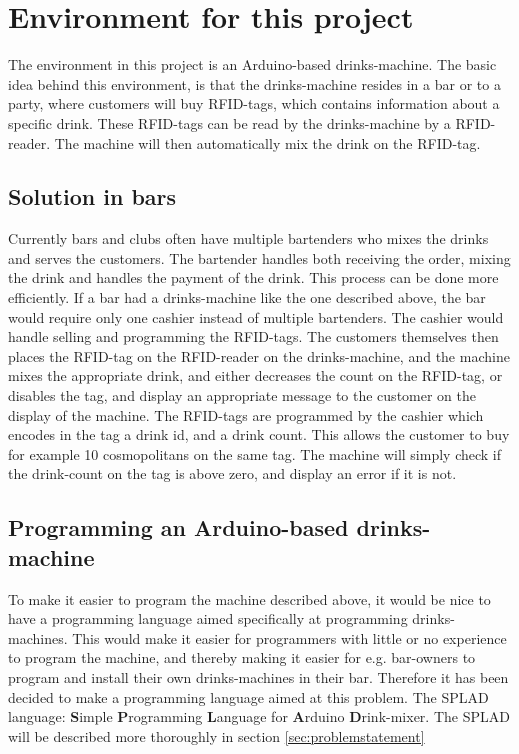 \section{Environment for this project}
The environment in this project is an Arduino-based drinks-machine. The basic idea behind this environment, is that the drinks-machine resides in a bar or to a party, where customers will buy RFID-tags, which contains information about a specific drink. These RFID-tags can be read by the drinks-machine by a RFID-reader. The machine will then automatically mix the drink on the RFID-tag.

\subsection{Solution in bars}
Currently bars and clubs often have multiple bartenders who mixes the drinks and serves the customers. The bartender handles both receiving the order, mixing the drink and handles the payment of the drink. This process can be done more efficiently. If a bar had a drinks-machine like the one described above, the bar would require only one cashier instead of multiple bartenders. The cashier would handle selling and programming the RFID-tags. The customers themselves then places the RFID-tag on the RFID-reader on the drinks-machine, and the machine mixes the appropriate drink, and either decreases the count on the RFID-tag, or disables the tag, and display an appropriate message to the customer on the display of the machine. The RFID-tags are programmed by the cashier which encodes in the tag a drink id, and a drink count. This allows the customer to buy for example 10 cosmopolitans on the same tag. The machine will simply check if the drink-count on the tag is above zero, and display an error if it is not.

\subsection{Programming an Arduino-based drinks-machine}
To make it easier to program the machine described above, it would be nice to have a programming language aimed specifically at programming drinks-machines. This would make it easier for programmers with little or no experience to program the machine, and thereby making it easier for e.g. bar-owners to program and install their own drinks-machines in their bar. Therefore it has been decided to make a programming language aimed at this problem. The SPLAD language: \textbf{S}imple \textbf{P}rogramming \textbf{L}anguage for \textbf{A}rduino \textbf{D}rink-mixer. The SPLAD will be described more thoroughly in section \ref{sec:problemstatement}